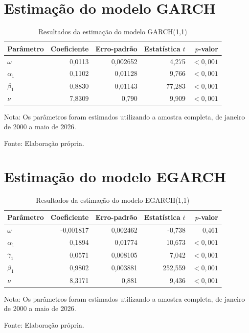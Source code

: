 \section{Estimação do modelo GARCH}

\begin{table}[H]
    \centering
    \caption{Resultados da estimação do modelo GARCH(1,1)}
    \label{tab:garch_coeficientes}
    \begin{tabular}{lrrrr}
        \toprule
        Parâmetro & Coeficiente & Erro-padrão & Estatística $t$ & $p$-valor \\
        \midrule
        $\omega$ & 0,0113 & 0,002652 & 4,275 & $<0,001$ \\
        $\alpha_1$ & 0,1102 & 0,01128 & 9,766 & $<0,001$ \\
        $\beta_1$ & 0,8830 & 0,01143 & 77,283 & $<0,001$ \\
        $\nu$ & 7,8309 & 0,790 & 9,909 & $<0,001$ \\
        \bottomrule
    \end{tabular}
    \begin{center}
        \footnotesize
        Nota: Os parâmetros foram estimados utilizando a amostra completa,
        de janeiro de 2000 a maio de 2026.

        Fonte: Elaboração própria.
    \end{center}
\end{table}

\section{Estimação do modelo EGARCH}

\begin{table}[H]
    \centering
    \caption{Resultados da estimação do modelo EGARCH(1,1)}
    \label{tab:egarch_coeficientes}
    \begin{tabular}{lrrrr}
        \toprule
        Parâmetro & Coeficiente & Erro-padrão & Estatística $t$ & $p$-valor \\
        \midrule
        $\omega$ & -0,001817 & 0,002462 & -0,738 & 0,461 \\
        $\alpha_1$ & 0,1894 & 0,01774 & 10,673 & $<0,001$ \\
        $\gamma_1$ & 0,0571 & 0,008105 & 7,042 & $<0,001$ \\
        $\beta_1$ & 0,9802 & 0,003881 & 252,559 & $<0,001$ \\
        $\nu$ & 8,3171 & 0,881 & 9,436 & $<0,001$ \\
        \bottomrule
    \end{tabular}
    \begin{center}
        \footnotesize 
        Nota: Os parâmetros foram estimados utilizando a amostra completa, 
        de janeiro de 2000 a maio de 2026.
        
        Fonte: Elaboração própria.
    \end{center}
\end{table}

